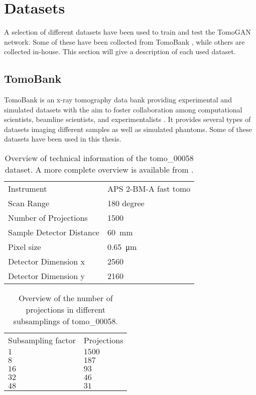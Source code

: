 
\section{Datasets}
\label{sec:method:datasets}
A selection of different datasets have been used to train and test the TomoGAN network. Some of these have been collected from TomoBank \cite{TomoBank}, while others are collected in-house. This section will give a description of each used dataset. 

\subsection{TomoBank}
TomoBank is an x-ray tomography data bank providing experimental and simulated datasets with the aim to foster collaboration among computational scientists, beamline scientists, and experimentalists \cite{TomoBank}. It provides several types of datasets imaging different samples as well as simulated phantoms. Some of these datasets have been used in this thesis.


\begin{table}[htbp]
    \centering
    \caption[Dataset information tomo\_00058]{Overview of technical information of the tomo\_00058 dataset. A more complete overview is available from \cite{datasetglassspheres}. }
    \label{tab:tomo00058}
    \begin{tabular}{ll}
    \hline
    Instrument & APS 2-BM-A fast tomo \\
    Scan Range & 180 degree \\
    Number of Projections & 1500 \\
    Sample Detector Distance & \SI{60}{\milli \meter} \\
    Pixel size & \SI{0.65}{\micro \meter} \\
    Detector Dimension x & 2560 \\
    Detector Dimension y & 2160 \\
    \hline
    \end{tabular}
\end{table}

\begin{table}[htbp]
    \centering
    \caption[Projection subsampling overview tomo\_00058]{Overview of the number of projections in different subsamplings of tomo\_00058. }
    \label{tab:projectionsubsampling}
    \begin{tabular}{ll}
    \hline
    Subsampling factor & Projections \\
    \hhline{==}
    $1$ & $1500$ \\
    $8$ & $187$ \\
    $16$ & $93$ \\
    $32$ & $46$ \\
    $48$ & $31$ \\
    \hline
    \end{tabular}
\end{table}

